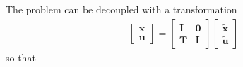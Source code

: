 \documentclass[letterpaper,10pt,english]{jupyterBook}
\begin{document}
\sphinxAtStartPar
The problem can be decoupled with a transformation
\begin{equation*}
\begin{split}\begin{bmatrix} \mathbf{x} \\ \mathbf{u} \end{bmatrix} = \begin{bmatrix} \mathbf{I} & \mathbf{0} \\ \mathbf{T} & \mathbf{I} \end{bmatrix} \begin{bmatrix} \widetilde{\mathbf{x}} \\ \widetilde{\mathbf{u}} \end{bmatrix} \end{split}
\end{equation*}
\sphinxAtStartPar
so that
\end{document}
